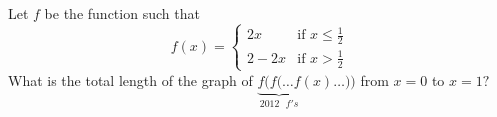 Let $f$ be the function such that
\[f(x)=\begin{cases}2x & \text{if }x\leq \frac{1}{2}\\2-2x & \text{if }x>\frac{1}{2}\end{cases}\]
What is the total length of the graph of $\underbrace{f(f(\ldots f}_{2012\text{ }f's}(x)\ldots))$ from $x=0$ to $x=1?$
